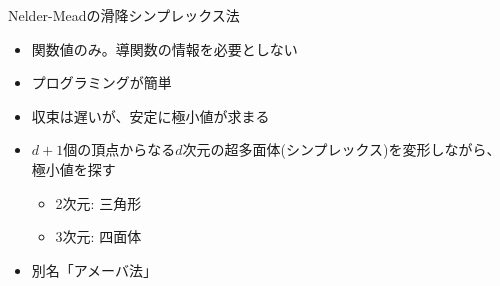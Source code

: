 \begin{frame}[t,fragile]{Nelder-Meadの滑降シンプレックス法}
  \begin{itemize}
  \item 関数値のみ。導関数の情報を必要としない
  \item プログラミングが簡単
  \item 収束は遅いが、安定に極小値が求まる
  \item $d+1$個の頂点からなる$d$次元の超多面体(シンプレックス)を変形しながら、極小値を探す
    \begin{itemize}
    \item 2次元: 三角形
    \item 3次元: 四面体
    \end{itemize}
  \item 別名「アメーバ法」
  \end{itemize}
\end{frame}
